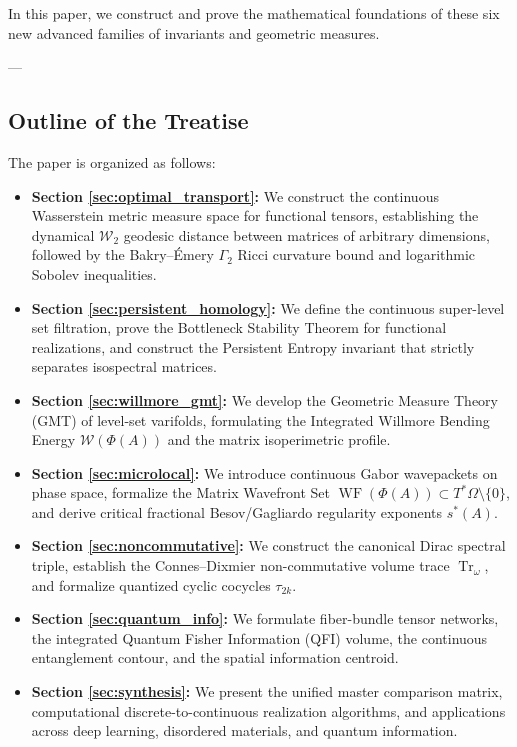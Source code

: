 \documentclass[11pt,a4paper,reqno]{amsart}
\theoremstyle{definition}
\numberwithin{equation}{section}
\newcommand{\Tr}{\operatorname{Tr}}
\newcommand{\WF}{\operatorname{WF}}
\begin{document}
In this paper, we construct and prove the mathematical foundations of these six new advanced families of invariants and geometric measures.

---

\subsection{Outline of the Treatise}
The paper is organized as follows:
\begin{itemize}
    \item \textbf{Section \ref{sec:optimal_transport}:} We construct the continuous Wasserstein metric measure space for functional tensors, establishing the dynamical $\mathcal{W}_2$ geodesic distance between matrices of arbitrary dimensions, followed by the Bakry--\'Emery $\Gamma_2$ Ricci curvature bound and logarithmic Sobolev inequalities.
    \item \textbf{Section \ref{sec:persistent_homology}:} We define the continuous super-level set filtration, prove the Bottleneck Stability Theorem for functional realizations, and construct the Persistent Entropy invariant that strictly separates isospectral matrices.
    \item \textbf{Section \ref{sec:willmore_gmt}:} We develop the Geometric Measure Theory (GMT) of level-set varifolds, formulating the Integrated Willmore Bending Energy $\mathcal{W}(\Phi(A))$ and the matrix isoperimetric profile.
    \item \textbf{Section \ref{sec:microlocal}:} We introduce continuous Gabor wavepackets on phase space, formalize the Matrix Wavefront Set $\WF(\Phi(A)) \subset T^*\Omega \setminus \{0\}$, and derive critical fractional Besov/Gagliardo regularity exponents $s^*(A)$.
    \item \textbf{Section \ref{sec:noncommutative}:} We construct the canonical Dirac spectral triple, establish the Connes--Dixmier non-commutative volume trace $\Tr_\omega$, and formalize quantized cyclic cocycles $\tau_{2k}$.
    \item \textbf{Section \ref{sec:quantum_info}:} We formulate fiber-bundle tensor networks, the integrated Quantum Fisher Information (QFI) volume, the continuous entanglement contour, and the spatial information centroid.
    \item \textbf{Section \ref{sec:synthesis}:} We present the unified master comparison matrix, computational discrete-to-continuous realization algorithms, and applications across deep learning, disordered materials, and quantum information.
\end{itemize}
\end{document}
